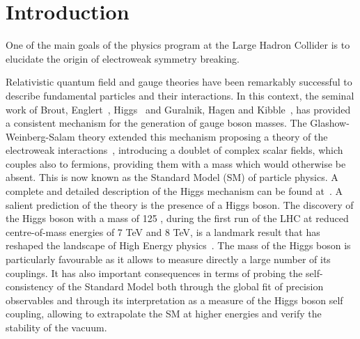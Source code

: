 \documentclass[../report.tex]{subfiles}
\begin{document}
\section{Introduction}


One of the main goals of the physics program at the Large Hadron
Collider is to elucidate the origin of  electroweak symmetry
breaking.

Relativistic quantum field and gauge theories have been remarkably
successful to describe fundamental particles and their
interactions. %
In this context, the seminal work
of Brout, Englert~\cite{Englert:1964et}, Higgs~\cite{Higgs:1964ia,Higgs:1964pj,Higgs:1966ev} and Guralnik, Hagen and Kibble~\cite{Guralnik:1964eu, Kibble:1967sv}, has provided a consistent mechanism for the generation
of gauge boson masses. %
The Glashow-Weinberg-Salam theory
extended this mechanism proposing a theory of the electroweak
interactions~\cite{Glashow:1961tr,Salam:1968,Weinberg:1967tq}, introducing a doublet of complex scalar
fields, which couples also to fermions, providing them with a  mass  which would otherwise be absent. This is now known as the Standard Model (SM) of particle physics. %
A complete and detailed description of the Higgs mechanism
can be found at~\cite{Tanabashi:2018oca}. A salient prediction of the theory is the
presence of a Higgs boson.
The discovery of the Higgs boson with a mass of 125 \UGeV, during the
first run of the LHC at reduced centre-of-mass energies of 7 TeV and
8 TeV, is a landmark result that has reshaped the landscape of High
Energy physics~\cite{Aad:2012tfa,Chatrchyan:2012xdj}. 
The mass of the Higgs boson is particularly favourable
as it allows to measure directly a large number of its couplings. It
has also important consequences in terms of probing the self-consistency of the Standard Model both through the global fit of
precision observables and through its interpretation as a measure of the Higgs boson self coupling, allowing to extrapolate the SM at
higher energies and verify the stability of the vacuum.
\end{document}
